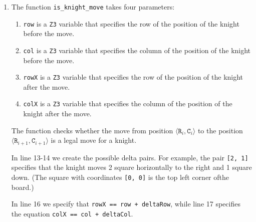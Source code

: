 \begin{enumerate}
\item The function \texttt{is\_knight\_move} takes four parameters:
      \begin{enumerate}
      \item \texttt{row} is a \texttt{Z3} variable that specifies the row of the position of the knight before
            the move. 
      \item \texttt{col} is a \texttt{Z3} variable that specifies the column of the position of the knight
            before the move. 
      \item \texttt{rowX} is a \texttt{Z3} variable that specifies the row of the position of the knight after
            the move. 
      \item \texttt{colX} is a \texttt{Z3} variable that specifies the column of the position of the knight
            after the move. 
      \end{enumerate}
      The function checks whether the move from position 
      $\langle \mathtt{R}_i, \mathtt{C}_i \rangle$ to the position $\langle \mathtt{R}_{i+1}, \mathtt{C}_{i+1} \rangle$
      is a legal move for a knight.

      In line 13-14 we create the possible delta pairs.  For example, the pair \texttt{[2, 1]} specifies that
      the knight moves 2 square horizontally to the right and 1 square down.
      (The square with coordinates  \texttt{[0, 0]} is the top left corner ofthe board.)

      In line 16 we specify that \texttt{rowX == row + deltaRow}, while line 17 specifies the equation
      \texttt{colX == col + deltaCol}.
      

\end{enumerate}
